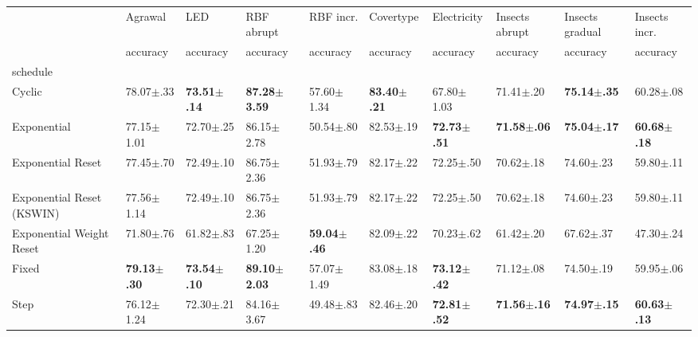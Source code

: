 \begin{tabular}{llllllllll}
    \toprule
                              & Agrawal                 & LED                     & RBF abrupt               & RBF incr.               & Covertype               & Electricity             & Insects abrupt          & Insects gradual         & Insects incr.           \\
                              & accuracy                & accuracy                & accuracy                 & accuracy                & accuracy                & accuracy                & accuracy                & accuracy                & accuracy                \\
    schedule                  &                         &                         &                          &                         &                         &                         &                         &                         &                         \\
    \midrule
    Cyclic                    & 78.07$\pm$.33           & \bfseries 73.51$\pm$.14 & \bfseries 87.28$\pm$3.59 & 57.60$\pm$1.34          & \bfseries 83.40$\pm$.21 & 67.80$\pm$1.03          & 71.41$\pm$.20           & \bfseries 75.14$\pm$.35 & 60.28$\pm$.08           \\
    Exponential               & 77.15$\pm$1.01          & 72.70$\pm$.25           & 86.15$\pm$2.78           & 50.54$\pm$.80           & 82.53$\pm$.19           & \bfseries 72.73$\pm$.51 & \bfseries 71.58$\pm$.06 & \bfseries 75.04$\pm$.17 & \bfseries 60.68$\pm$.18 \\
    Exponential Reset         & 77.45$\pm$.70           & 72.49$\pm$.10           & 86.75$\pm$2.36           & 51.93$\pm$.79           & 82.17$\pm$.22           & 72.25$\pm$.50           & 70.62$\pm$.18           & 74.60$\pm$.23           & 59.80$\pm$.11           \\
    Exponential Reset (KSWIN) & 77.56$\pm$1.14          & 72.49$\pm$.10           & 86.75$\pm$2.36           & 51.93$\pm$.79           & 82.17$\pm$.22           & 72.25$\pm$.50           & 70.62$\pm$.18           & 74.60$\pm$.23           & 59.80$\pm$.11           \\
    Exponential Weight Reset  & 71.80$\pm$.76           & 61.82$\pm$.83           & 67.25$\pm$1.20           & \bfseries 59.04$\pm$.46 & 82.09$\pm$.22           & 70.23$\pm$.62           & 61.42$\pm$.20           & 67.62$\pm$.37           & 47.30$\pm$.24           \\
    Fixed                     & \bfseries 79.13$\pm$.30 & \bfseries 73.54$\pm$.10 & \bfseries 89.10$\pm$2.03 & 57.07$\pm$1.49          & 83.08$\pm$.18           & \bfseries 73.12$\pm$.42 & 71.12$\pm$.08           & 74.50$\pm$.19           & 59.95$\pm$.06           \\
    Step                      & 76.12$\pm$1.24          & 72.30$\pm$.21           & 84.16$\pm$3.67           & 49.48$\pm$.83           & 82.46$\pm$.20           & \bfseries 72.81$\pm$.52 & \bfseries 71.56$\pm$.16 & \bfseries 74.97$\pm$.15 & \bfseries 60.63$\pm$.13 \\
    \bottomrule
\end{tabular}
